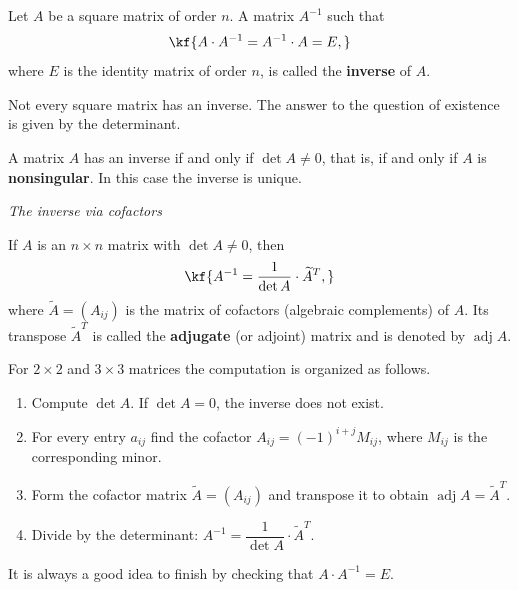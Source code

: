 \vspace{3pt}
\begin{tarif}
Let $A$ be a square matrix of order $n$. A matrix $A^{-1}$ such that
\[\kf{A\cdot A^{-1} = A^{-1}\cdot A = E,}\]
where $E$ is the identity matrix of order $n$, is called the
\textbf{inverse} of $A$.
\end{tarif}
Not every square matrix has an inverse. The answer to the question of
existence is given by the determinant.
\vspace{3pt}
\begin{teorema}
A matrix $A$ has an inverse if and only if $\det A \neq 0$, that is, if and
only if $A$ is \textbf{nonsingular}. In this case the inverse is unique.
\end{teorema}
\emph{The inverse via cofactors}
\vspace{3pt}
\begin{tarif}
If $A$ is an $n\times n$ matrix with $\det A \neq 0$, then
\[\kf{A^{-1} = \frac{1}{\det A}\cdot \widetilde{A}^{T},}\]
where $\widetilde{A} = (A_{ij})$ is the matrix of cofactors (algebraic
complements) of $A$. Its transpose $\widetilde{A}^{T}$ is called the
\textbf{adjugate} (or adjoint) matrix and is denoted by $\operatorname{adj}A$.
\end{tarif}
For $2\times 2$ and $3\times 3$ matrices the computation is organized as
follows.
\begin{enumerate}[label=\arabic*.]
\item Compute $\det A$. If $\det A = 0$, the inverse does not exist.
\item For every entry $a_{ij}$ find the cofactor $A_{ij} = (-1)^{i+j}M_{ij}$,
where $M_{ij}$ is the corresponding minor.
\item Form the cofactor matrix $\widetilde{A}=(A_{ij})$ and transpose it to
obtain $\operatorname{adj}A=\widetilde{A}^{T}$.
\item Divide by the determinant: $A^{-1} = \dfrac{1}{\det A}\cdot \widetilde{A}^{T}$.
\end{enumerate}
It is always a good idea to finish by checking that $A\cdot A^{-1} = E$.

